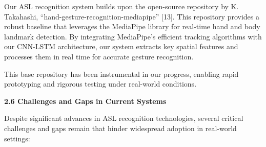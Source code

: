 \documentclass[12pt]{article}
\begin{document}
Our ASL recognition system builds upon the open-source repository by K. Takahashi, 
“hand-gesture-recognition-mediapipe” [13]. This repository provides a robust baseline that 
leverages the MediaPipe library for real-time hand and body landmark detection. By integrating 
MediaPipe’s efficient tracking algorithms with our CNN-LSTM architecture, our 
system extracts key spatial features and processes them in real time for accurate gesture 
recognition.


This base repository has been instrumental in our progress, enabling rapid prototyping 
and rigorous testing under real-world conditions.


\vspace{1.5em}
\noindent
\textbf{2.6 Challenges and Gaps in Current Systems}
\vspace{1em}

Despite significant advances in ASL recognition technologies, several critical challenges 
and gaps remain that hinder widespread adoption in real-world settings:
\end{document}
